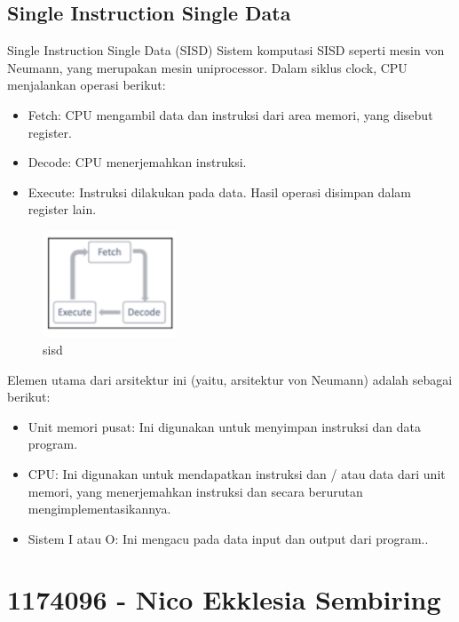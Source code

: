 \subsection{Single Instruction Single Data}
\hfill\break
Single Instruction Single Data (SISD) Sistem komputasi SISD seperti mesin von Neumann, yang merupakan mesin uniprocessor. 
Dalam siklus clock, CPU menjalankan operasi berikut:
\begin{itemize}
	\item Fetch: CPU mengambil data dan instruksi dari area memori, yang disebut register.
	\item Decode: CPU menerjemahkan instruksi.
	\item Execute: Instruksi dilakukan pada data. Hasil operasi disimpan dalam register lain.
\end{itemize}
\hfill\break
    \begin{figure}[H]
        \includegraphics[width=4cm]{figures/kelompok3/1/arjun2.png}
        \centering
        \caption{sisd}
    \end{figure}
\hfill\break
Elemen utama dari arsitektur ini (yaitu, arsitektur von Neumann) adalah sebagai berikut:
\begin{itemize}
	\item Unit memori pusat: Ini digunakan untuk menyimpan instruksi dan data program.
	\item CPU: Ini digunakan untuk mendapatkan instruksi dan / atau data dari unit memori, yang menerjemahkan instruksi dan secara berurutan mengimplementasikannya.
	\item Sistem I atau  O: Ini mengacu pada data input dan output dari program..
\end{itemize}

\section{1174096 - Nico Ekklesia Sembiring}
